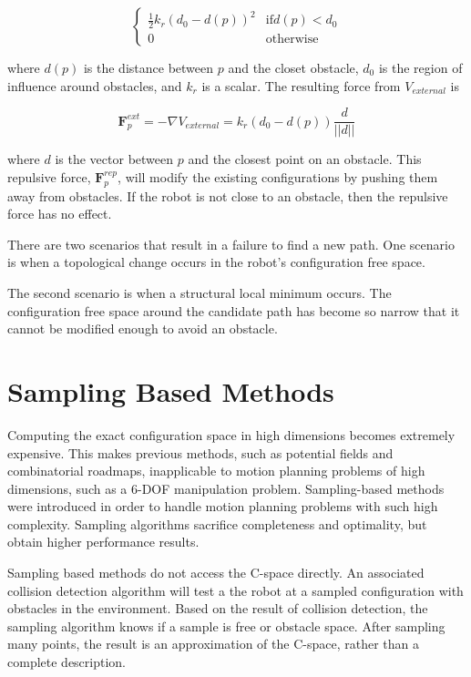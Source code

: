 \documentclass[10pt,conference]{ieeeconf}
\begin{document}
\[ \begin{cases} 
      \frac{1}{2}k_r(d_0 - d(p))^2 & \text{if} d(p) < d_0 \\
      0 & \text{otherwise}
   \end{cases}
\]

where $d(p)$ is the distance between $p$ and the closet obstacle, $d_0$ is the region of influence around obstacles, and $k_r$ is a scalar. The resulting force from $V_{external}$ is

\begin{equation}
\textbf{F}^{ext}_p = -\nabla V_{external} = k_r(d_0-d(p))\frac{d}{||d||}
\end{equation}

where $d$ is the vector between $p$ and the closest point on an obstacle. This repulsive force, $\textbf{F}^{rep}_p$, will modify the existing configurations by pushing them away from obstacles. If the robot is not close to an obstacle, then the repulsive force has no effect.


There are two scenarios that result in a failure to find a new path. One scenario is when a topological change occurs in the robot's configuration free space.

The second scenario is when a structural local minimum occurs. The configuration free space around the candidate path has become so narrow that it cannot be modified enough to avoid an obstacle.


	
\section{Sampling Based Methods}

Computing the exact configuration space in high dimensions becomes extremely expensive. This makes previous methods, such as potential fields and combinatorial roadmaps, inapplicable to motion planning problems of high dimensions, such as a 6-DOF manipulation problem. Sampling-based methods were introduced in order to handle motion planning problems with such high complexity. Sampling algorithms sacrifice completeness and optimality, but obtain higher performance results. 

Sampling based methods do not access the C-space directly. An associated collision detection algorithm will test a the robot at a sampled configuration with obstacles in the environment. Based on the result of collision detection, the sampling algorithm knows if a sample is free or obstacle space. After sampling many points, the result is an approximation of the C-space, rather than a complete description. 
\end{document}
